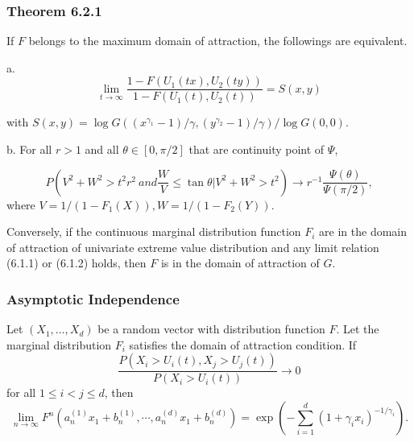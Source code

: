 \documentclass{beamer}
\newcommand{\suit}[1]{\left(#1\right)}
\begin{document}
\begin{frame}
    \frametitle{Theorem 6.2.1}
If $F$ belongs to the maximum domain of attraction, the followings are equivalent.

a. 
\begin{equation}\tag{6.2.1}
    \lim_{t\to \infty} \dfrac{1-F(U_1(tx),U_2(ty))}{1-F(U_1(t),U_2(t))}=S(x,y)  
\end{equation}

with $S(x,y)=\log G((x^{\gamma_1}-1)/\gamma,(y^{\gamma_2}-1)/\gamma)/\log G(0,0)$.

b. For all $r>1$ and all $\theta \in [0,\pi/2]$ that   are continuity point of $\Psi$,

\begin{equation}\tag{6.2.1}
P\suit{V^2+W^2>t^2r^2\ and \frac{W}{V}\le \tan \theta | V^2+W^2>t^2}\to r^{-1}\frac{\Psi(\theta)}{\Psi(\pi/2)},
\end{equation}
where $V=1/(1-F_1(X)), W=1/(1-F_2(Y))$.
\bigskip

Conversely, if the continuous  marginal distribution function  $F_i$ are in the domain of attraction of univariate extreme value distribution and any limit relation (6.1.1) or (6.1.2) holds, then $F$ is in the domain of attraction of $G$.

\end{frame}




\begin{frame}
    \frametitle{Asymptotic Independence}

    Let $(X_1,\dots,X_d)$  be a random vector with distribution function  $F$. Let the marginal distribution $F_i$ satisfies the domain of attraction condition. If
    $$
    \dfrac{P(X_i>U_i(t),X_j>U_j(t))}{P(X_i>U_i(t))}\to 0
    $$
    for all $1\le i<j\le d$, then 
    $$
\lim_{n \to \infty} F^n(a_n^{(1)}x_1+b_n^{(1)},\cdots, a_n^{(d)}x_1+b_n^{(d)})=\exp\suit{-\sum_{i=1}^d (1+\gamma_ix_i)^{-1/\gamma_i}}.
    $$

\end{frame}
\end{document}
